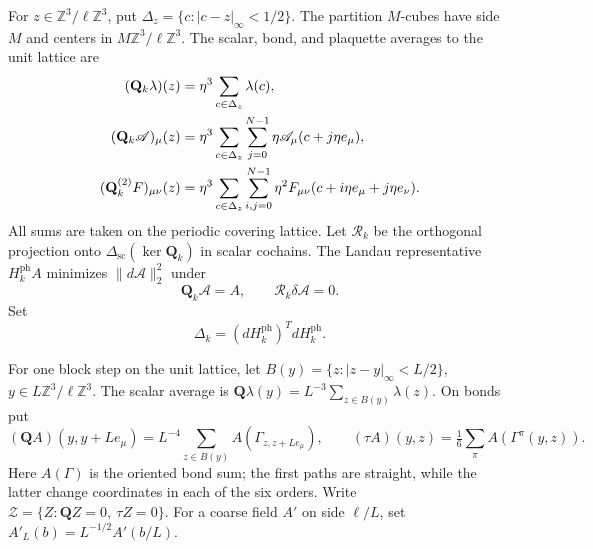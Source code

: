 \documentclass[11pt,letterpaper,reqno]{amsart}
\newcommand{\Z}{\mathbb Z}
\begin{document}
For \(z\in\Z^3/\ell\Z^3\), put
\(\Delta_z=\{c:|c-z|_\infty<1/2\}\).
The partition \(M\)-cubes have side \(M\) and centers in
\(M\Z^3/\ell\Z^3\).
The scalar, bond, and plaquette averages to the unit lattice are
\begin{align}
 (\mathbf Q_k\lambda)(z)
   &=\eta^3\sum_{c\in\Delta_z}\lambda(c),\notag\\
 (\mathbf Q_k\mathscr A)_\mu(z)
   &=\eta^3\sum_{c\in\Delta_z}\sum_{j=0}^{N-1}
          \eta\mathscr A_\mu(c+j\eta e_\mu),\label{eq:photon-block-averages}\\
 (\mathbf Q_k^{(2)}F)_{\mu\nu}(z)
   &=\eta^3\sum_{c\in\Delta_z}\sum_{i,j=0}^{N-1}
          \eta^2F_{\mu\nu}(c+i\eta e_\mu+j\eta e_\nu).\notag
\end{align}
All sums are taken on the periodic covering lattice.
Let \(\mathcal R_k\) be the orthogonal projection onto
\(\Delta_{\mathrm{sc}}(\ker\mathbf Q_k)\) in scalar cochains.
The Landau representative \(H_k^{\mathrm{ph}}A\) minimizes
\(\|d\mathscr A\|_2^2\) under
\begin{equation}\label{eq:photon-Landau-constraints}
 \mathbf Q_k\mathscr A=A,\qquad \mathcal R_k\delta\mathscr A=0.
\end{equation}
Set
\begin{equation}\label{eq:photon-coarse-form}
 \Delta_k=(dH_k^{\mathrm{ph}})^TdH_k^{\mathrm{ph}}.
\end{equation}

For one block step on the unit lattice, let
\(B(y)=\{z:|z-y|_\infty<L/2\}\), \(y\in L\Z^3/\ell\Z^3\).
The scalar average is
\(\mathbf Q\lambda(y)=L^{-3}\sum_{z\in B(y)}\lambda(z)\).
On bonds put
\[
 (\mathbf QA)(y,y+Le_\mu)
   =L^{-4}\sum_{z\in B(y)}A(\Gamma_{z,z+Le_\mu}),\qquad
 (\tau A)(y,z)=\tfrac16\sum_\pi A(\Gamma^\pi(y,z)).
\]
Here \(A(\Gamma)\) is the oriented bond sum; the first paths are
straight, while the latter change coordinates in each of the six
orders. Write \(\mathcal Z=\{Z:\mathbf QZ=0,\ \tau Z=0\}\).
For a coarse field \(A'\) on side \(\ell/L\), set
\(A'_L(b)=L^{-1/2}A'(b/L)\).
\end{document}
